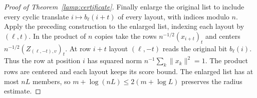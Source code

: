\begin{proof}[Proof of Theorem~\ref{lamp:certificate}]
Finally enlarge the original list to include every cyclic translate
\(i\mapsto b_\ell(i+t)\) of every layout, with indices modulo \(n\).
Apply the preceding construction to the enlarged list, indexing each
layout by \((\ell,t)\). In the product of \(n\) copies take the rows
\(n^{-1/2}(x_{i+t})_t\) and centers
\(n^{-1/2}(Z_{(\ell,-t),v})_t\). At row \(i+t\) layout
\((\ell,-t)\) reads the original bit \(b_\ell(i)\). Thus the row
at position \(i\) has squared norm \(n^{-1}\sum_k\|x_k\|^2=1\).
The product rows are centered and each layout keeps its score bound. The enlarged list has at most \(nL\) members,
so \(m+\log(nL)\le2(m+\log L)\) preserves the radius estimate.
\end{proof}
